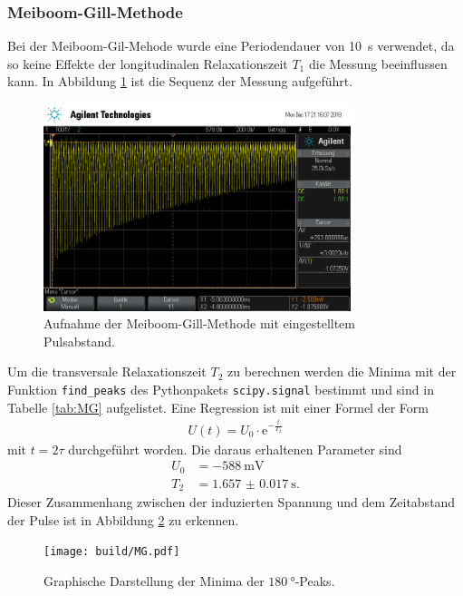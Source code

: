 \subsubsection{Meiboom-Gill-Methode}
Bei der Meiboom-Gil-Mehode wurde eine Periodendauer von \SI{10}{\second}
verwendet, da so keine Effekte der longitudinalen Relaxationszeit $T_1$ die
Messung beeinflussen kann. In Abbildung \ref{fig:MG} ist die Sequenz der Messung
aufgeführt.
\begin{figure}[htb]
  \centering
  \includegraphics[width=0.8\textwidth]{rohdaten/mg_2.png}
  \caption{Aufnahme der Meiboom-Gill-Methode mit eingestelltem Pulsabstand.}
  \label{fig:MG}
\end{figure}
Um die transversale Relaxationszeit $T_2$ zu berechnen werden die Minima mit der
Funktion \texttt{find\_peaks} des Pythonpakets \texttt{scipy.signal} bestimmt und
sind in Tabelle \ref{tab:MG} aufgelistet.
Eine Regression ist mit einer Formel
der Form
\begin{align*}
  U(t) = U_0 \cdot \text{e}^{-\frac{t}{T_2}}
\end{align*}
mit $t = 2\tau$ durchgeführt worden. Die daraus erhaltenen Parameter sind
\begin{align*}
  U_0 &= -\SI{588}{\milli\volt} \\
  T_2 &= \SI{1.657(17)}{\second}.
\end{align*}
Dieser Zusammenhang zwischen der induzierten Spannung und dem Zeitabstand der
Pulse ist in Abbildung \ref{plt:MG} zu erkennen.
\begin{figure}[htb]
  \centering
  \texttt{[image: build/MG.pdf]}
  \caption{Graphische Darstellung der Minima der $\SI{180}{\degree}$-Peaks.}
  \label{plt:MG}
\end{figure}
\FloatBarrier

